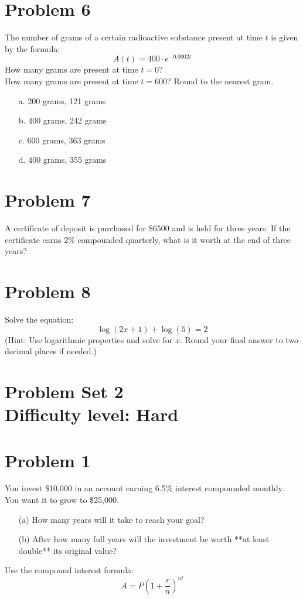 \documentclass[12pt]{article}
\begin{document}
\section*{Problem 6}
The number of grams of a certain radioactive substance present at time \( t \) is given by the formula:
\[
A(t) = 400 \cdot e^{-0.0002t}
\]
How many grams are present at time \( t = 0 \)?\\
How many grams are present at time \( t = 600 \)? Round to the nearest gram.

\begin{itemize}
    \item[a.] 200 grams, 121 grams
    \item[b.] 400 grams, 242 grams
    \item[c.] 600 grams, 363 grams
    \item[d.] 400 grams, 355 grams
\end{itemize}

\section*{Problem 7}
A certificate of deposit is purchased for \$6500 and is held for three years. If the certificate earns 2\% compounded quarterly, what is it worth at the end of three years?

\section*{Problem 8}
Solve the equation:
\[
\log(2x + 1) + \log(5) = 2
\]
(Hint: Use logarithmic properties and solve for \( x \). Round your final answer to two decimal places if needed.)

\section*{Problem Set 2\\Difficulty level: Hard}
\section*{Problem 1}
You invest \$10{,}000 in an account earning 6.5\% interest compounded monthly. You want it to grow to \$25{,}000.

\begin{itemize}
    \item[(a)] How many years will it take to reach your goal?
    \item[(b)] After how many full years will the investment be worth **at least double** its original value?
\end{itemize}

Use the compound interest formula:
\[
A = P \left(1 + \frac{r}{n} \right)^{nt}
\]
\end{document}
